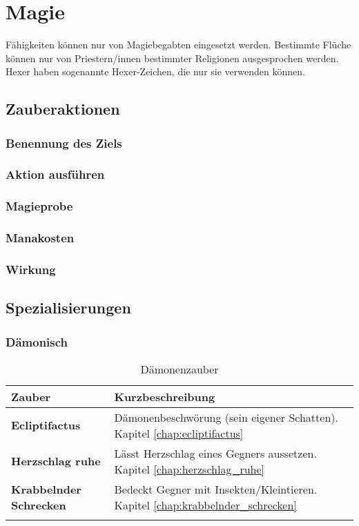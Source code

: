 {\let\clearpage\relax\chapter{Magie}}
Fähigkeiten können nur von Magiebegabten eingesetzt werden. Bestimmte Flüche können nur von Priestern/innen bestimmter Religionen ausgesprochen werden. Hexer haben sogenannte Hexer-Zeichen, die nur sie verwenden können.

\section{Zauberaktionen}

\subsection{Benennung des Ziels}

\subsection{Aktion ausführen}

\subsection{Magieprobe}

\subsection{Manakosten}

\subsection{Wirkung}


\section{Spezialisierungen}

\subsection{Dämonisch}
\begin{longtable}{|p{5cm}|p{10cm}|}
\hline
\textbf{Zauber} & \textbf{Kurzbeschreibung} \\ \hline

\textbf{Ecliptifactus} & Dämonenbeschwörung (sein eigener Schatten). Kapitel \ref{chap:ecliptifactus} \\ \hline

\textbf{Herzschlag ruhe} & Lässt Herzschlag eines Gegners aussetzen. Kapitel \ref{chap:herzschlag_ruhe} \\ \hline

\textbf{Krabbelnder Schrecken} & Bedeckt Gegner mit Insekten/Kleintieren. Kapitel \ref{chap:krabbelnder_schrecken} \\ \hline

\caption{Dämonenzauber}
\label{tab:daemonenzauber}
\end{longtable}


